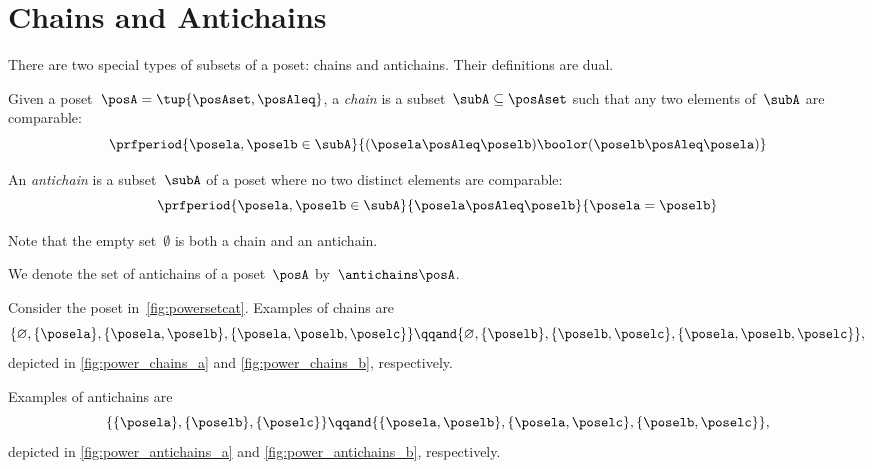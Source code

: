 
\section{Chains and Antichains}
\label{sec:chains-antichains}

There are two special types of subsets of a poset: chains and antichains.
Their definitions are dual.

\begin{definition}
	\label{def:chain}
	Given a poset~$\posA = \tup{\posAset, \posAleq}$, a \emph{chain} is a subset~$\subA \subseteq \posAset$ such that any two elements of~$\subA$ are comparable:
	\begin{equation}
		\prfperiod{
			\posela,\poselb \in \subA
		}{
			(\posela \posAleq  \poselb) \boolor (\poselb \posAleq  \posela)
		}
	\end{equation}
\end{definition}

\begin{definition}
	\label{def:antichain}
	An \emph{antichain} is a subset~$\subA$ of a poset where no two distinct elements are comparable:
	\begin{equation}
		\prfperiod{
			\posela,\poselb \in \subA
		}{
			\posela \posAleq \poselb
		}{
			\posela = \poselb
		}
	\end{equation}
\end{definition}
\begin{remark}
	Note that the empty set~$\emptyset$ is both a chain and an antichain.
\end{remark}

We denote the set of antichains of a poset~$\posA$ by~$\antichains\posA$.

\begin{example}
	Consider the poset in~\cref{fig:powersetcat}.
	Examples of chains are
	\begin{equation}
		\{\varnothing,\{\posela\},\{\posela,\poselb\},\{\posela,\poselb,\poselc\}\}
		\qqand
		\{\varnothing,\{\poselb\},\{\poselb,\poselc\},\{\posela,\poselb,\poselc\}\},
	\end{equation}
	depicted in \cref{fig:power_chains_a} and \cref{fig:power_chains_b}, respectively.

	Examples of antichains are
	\begin{equation}
		\{\{\posela\},\{\poselb\},\{\poselc\}\}
		\qqand
		\{ \{\posela,\poselb\},\{\posela,\poselc\}, \{\poselb,\poselc\}\},
	\end{equation}
	depicted in \cref{fig:power_antichains_a} and \cref{fig:power_antichains_b}, respectively.

\end{example}

